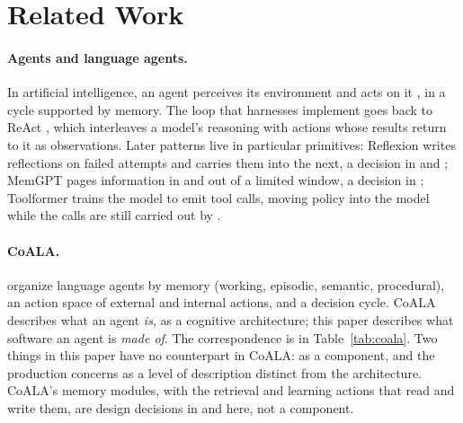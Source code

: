 \section{Related Work}
\label{sec:related}

\paragraph{Agents and language agents.} In artificial intelligence, an agent perceives its environment and acts on it \citep{russell2020aima}, in a cycle supported by memory. The loop that harnesses implement goes back to ReAct \citep{yao2023react}, which interleaves a model's reasoning with actions whose results return to it as observations. Later patterns live in particular primitives: Reflexion \citep{shinn2023reflexion} writes reflections on failed attempts and carries them into the next, a decision in  and ; MemGPT \citep{packer2023memgpt} pages information in and out of a limited window, a decision in ; Toolformer \citep{schick2023toolformer} trains the model to emit tool calls, moving policy into the model while the calls are still carried out by .

\paragraph{CoALA.} \citet{sumers2024coala} organize language agents by memory (working, episodic, semantic, procedural), an action space of external and internal actions, and a decision cycle. CoALA describes what an agent \emph{is}, as a cognitive architecture; this paper describes what software an agent is \emph{made of}. The correspondence is in Table~\ref{tab:coala}. Two things in this paper have no counterpart in CoALA:  as a component, and the production concerns as a level of description distinct from the architecture. CoALA's memory modules, with the retrieval and learning actions that read and write them, are design decisions in  and  here, not a component.

